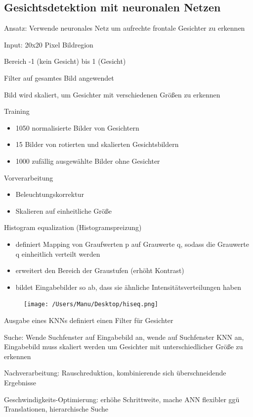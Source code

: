 \documentclass[paper=a4, fontsize=11pt]{scrartcl} %
\numberwithin{equation}{section} %
\numberwithin{figure}{section} %
\numberwithin{table}{section} %
\begin{document}
\subsection{Gesichtsdetektion mit neuronalen Netzen}

\begin{itemize}
\item Ansatz: Verwende neuronales Netz um aufrechte frontale Gesichter zu erkennen
\item Input: 20x20 Pixel Bildregion
\item Bereich -1 (kein Gesicht) bis 1 (Gesicht)
\item Filter auf gesamtes Bild angewendet
\item Bild wird skaliert, um Gesichter mit verschiedenen Größen zu erkennen
\item Training
\begin{itemize}
\item 1050 normalisierte Bilder von Gesichtern
\item 15 Bilder von rotierten und skalierten Gesichtsbildern
\item 1000 zufällig ausgewählte Bilder ohne Gesichter
\end{itemize}
\item Vorverarbeitung
\begin{itemize}
\item Beleuchtungskorrektur
\item Skalieren auf einheitliche Größe
\end{itemize}
\begin{minipage}{0.5\textwidth}
\item Histogram equalization (Histogramspreizung)
\begin{itemize}
\item definiert Mapping von Graufwerten p auf Grauwerte q, sodass die Grauwerte q einheitlich verteilt werden
\item erweitert den Bereich der Graustufen (erhöht Kontrast)
\item bildet Eingabebilder so ab, dass sie ähnliche Intensitätsverteilungen haben
\end{itemize}
\end{minipage} \hfill
\begin{minipage}{0.45\textwidth}
\begin{figure}[H]
\texttt{[image: /Users/Manu/Desktop/hiseq.png]}
\end{figure}
\end{minipage}
\item Ausgabe eines KNNs definiert einen Filter für Gesichter
\item Suche: Wende Suchfenster auf Eingabebild an, wende auf Suchfenster KNN an, Eingabebild muss skaliert werden um Gesichter mit unterschiedlicher Größe zu erkennen
\item Nachverarbeitung: Rauschreduktion, kombinierende sich überschneidende Ergebnisse
\item Geschwindigkeits-Optimierung: erhöhe Schrittweite, mache ANN flexibler ggü Translationen, hierarchische Suche
\end{itemize}
\end{document}
